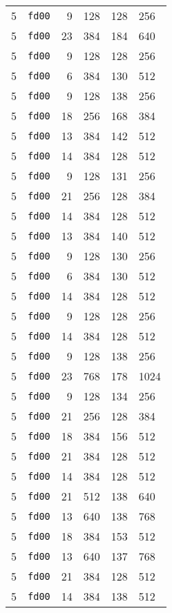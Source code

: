\documentclass{article}
\begin{document}
\begin{table}[h!]
\begin{tabular}{llrrrl}
    5 & \texttt{fd00} & 9 & 128 & 128 & 256 \\
    5 & \texttt{fd00} & 23 & 384 & 184 & 640 \\
    5 & \texttt{fd00} & 9 & 128 & 128 & 256 \\
    5 & \texttt{fd00} & 6 & 384 & 130 & 512 \\
    5 & \texttt{fd00} & 9 & 128 & 138 & 256 \\
    5 & \texttt{fd00} & 18 & 256 & 168 & 384 \\
    5 & \texttt{fd00} & 13 & 384 & 142 & 512 \\
    5 & \texttt{fd00} & 14 & 384 & 128 & 512 \\
    5 & \texttt{fd00} & 9 & 128 & 131 & 256 \\
    5 & \texttt{fd00} & 21 & 256 & 128 & 384 \\
    5 & \texttt{fd00} & 14 & 384 & 128 & 512 \\
    5 & \texttt{fd00} & 13 & 384 & 140 & 512 \\
    5 & \texttt{fd00} & 9 & 128 & 130 & 256 \\
    5 & \texttt{fd00} & 6 & 384 & 130 & 512 \\
    5 & \texttt{fd00} & 14 & 384 & 128 & 512 \\
    5 & \texttt{fd00} & 9 & 128 & 128 & 256 \\
    5 & \texttt{fd00} & 14 & 384 & 128 & 512 \\
    5 & \texttt{fd00} & 9 & 128 & 138 & 256 \\
    5 & \texttt{fd00} & 23 & 768 & 178 & 1024 \\
    5 & \texttt{fd00} & 9 & 128 & 134 & 256 \\
    5 & \texttt{fd00} & 21 & 256 & 128 & 384 \\
    5 & \texttt{fd00} & 18 & 384 & 156 & 512 \\
    5 & \texttt{fd00} & 21 & 384 & 128 & 512 \\
    5 & \texttt{fd00} & 14 & 384 & 128 & 512 \\
    5 & \texttt{fd00} & 21 & 512 & 138 & 640 \\
    5 & \texttt{fd00} & 13 & 640 & 138 & 768 \\
    5 & \texttt{fd00} & 18 & 384 & 153 & 512 \\
    5 & \texttt{fd00} & 13 & 640 & 137 & 768 \\
    5 & \texttt{fd00} & 21 & 384 & 128 & 512 \\
    5 & \texttt{fd00} & 14 & 384 & 138 & 512 \\

\end{tabular}
\end{table}
\end{document}
